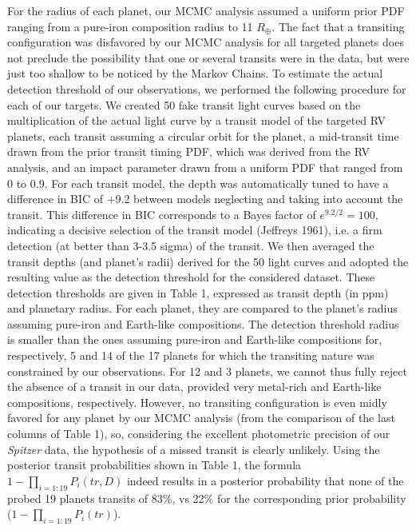 \documentclass[traditabstract]{aa}
\begin{document}
For the radius of each planet, our MCMC analysis assumed  a uniform prior PDF ranging from a pure-iron composition radius to 11 $R_{\oplus}$.  The fact that a transiting configuration was  disfavored by our MCMC analysis for all targeted planets does not preclude the possibility that one or several transits were in the data, but were just too shallow to be noticed by the Markov Chains. To estimate the actual detection threshold of our observations, we performed the following procedure for each of our targets. We created 50 fake transit light curves based on the multiplication of the actual light curve by a transit model of the targeted RV planets, each transit assuming a circular orbit for the planet, a mid-transit time drawn from the prior transit timing PDF, which was derived from the RV analysis, and an impact parameter drawn from a uniform PDF that ranged from 0 to 0.9. For each transit model, the depth was automatically tuned to have a difference in BIC of +9.2 between models neglecting and taking into account the transit. This difference in BIC corresponds to a Bayes factor of $e^{9.2/2}=100$, indicating a decisive selection of the transit model (Jeffreys 1961), i.e. a firm detection (at better than 3-3.5 sigma) of the transit. We then averaged the transit depths (and planet's radii) derived for the 50 light curves and adopted the resulting value as the detection threshold for the considered dataset. These detection thresholds are given in Table 1, expressed as transit depth (in ppm) and planetary radius. For each planet, they are compared to the planet's radius assuming pure-iron and Earth-like compositions. The detection threshold radius is smaller than the ones assuming pure-iron and Earth-like compositions for, respectively, 5 and 14 of the 17 planets for which the transiting nature was constrained by our observations. For 12 and 3 planets, we cannot thus fully reject the absence of a transit in our data, provided very metal-rich and Earth-like compositions, respectively. However, no transiting configuration is even midly favored for any planet  by our MCMC analysis (from the comparison of the last columns of Table 1), so, considering the excellent photometric precision of our {\it Spitzer} data, the hypothesis of a missed transit is clearly unlikely. Using the posterior transit probabilities shown in Table 1, the formula $1-\prod_{i=1:19} P_i(tr,D)$ indeed results  in a posterior probability that none of the probed 19 planets transits of 83\%, vs 22\% for the corresponding  prior probability ($1-\prod_{i=1:19} P_i(tr)$).  
\end{document}
